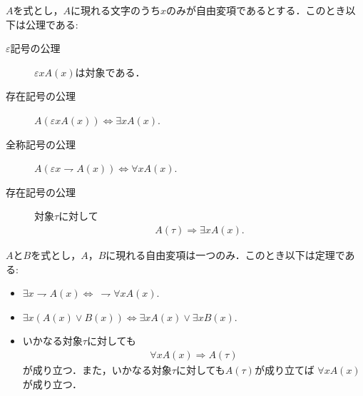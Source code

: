 	\begin{screen}
		$A$を式とし，$A$に現れる文字のうち$x$のみが自由変項であるとする．このとき以下は公理である:
		\begin{description}
			\item[$\varepsilon$記号の公理] $\varepsilon x A(x)$は対象である．
			\item[存在記号の公理] $A (\varepsilon x A(x)) \Longleftrightarrow \exists x A(x)$.
			\item[全称記号の公理] $A (\varepsilon x \rightharpoondown A(x)) \Longleftrightarrow \forall x A(x)$.
			\item[存在記号の公理] 対象$\tau$に対して
				\begin{align}
					A(\tau) \Longrightarrow \exists x A(x).
				\end{align}
		\end{description}
	\end{screen}
	
	\begin{screen}
		\begin{metathm}
			$A$と$B$を式とし，$A$，$B$に現れる自由変項は一つのみ．このとき以下は定理である:
			\begin{itemize}
				\item $\exists x \rightharpoondown A(x) \Longleftrightarrow\ \rightharpoondown \forall x A(x)$.
				\item $\exists x ( A(x) \vee B(x) ) \Longleftrightarrow \exists x A(x) \vee \exists x B(x)$.
				\item いかなる対象$\tau$に対しても
					\begin{align}
						\forall x A(x) \Longrightarrow A(\tau)
					\end{align}
					が成り立つ．また，いかなる対象$\tau$に対しても$A(\tau)$が成り立てば
					$\forall x A(x)$が成り立つ．
			\end{itemize}
		\end{metathm}
	\end{screen}
	
